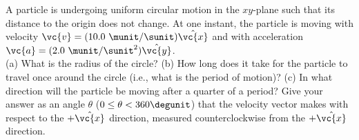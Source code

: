 A particle is undergoing uniform circular motion in the $xy$-plane
such that its distance to the origin does not change. At one instant,
the particle is moving with velocity 
$\vc{v} = (10.0\ \munit/\sunit) \hat{\vc{x}}$
and with acceleration $\vc{a} = (2.0\ \munit/\sunit^2) \hat{\vc{y}}$.\\
%
(a) What is the radius of the circle?\answercheck\hwendpart
%
(b) How long does it take for the particle to travel once around the
circle (i.e., what is the period of motion)?\answercheck\hwendpart
%
(c) In what direction will the particle be moving after a quarter of a
period? Give your answer as an angle $\theta$ ($0 \leq \theta <
360\degunit$) that the velocity vector makes with respect to the
$+\hat{\vc{x}}$ direction, measured counterclockwise from the $+\hat{\vc{x}}$
direction.\answercheck
